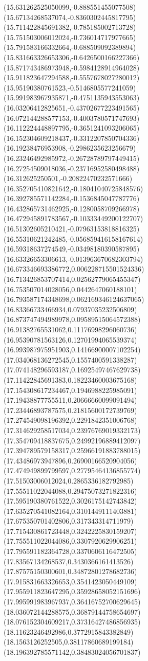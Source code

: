 {(15.631262525050099,-0.888551455077508)
(15.67134268537074,-0.8360302445817795)
(15.711422845691382,-0.785185002713728)
(15.751503006012024,-0.736014717977665)
(15.791583166332664,-0.688509092389894)
(15.831663326653306,-0.6426500166227366)
(15.871743486973948,-0.5984128914964028)
(15.911823647294588,-0.5557678027280012)
(15.95190380761523,-0.5146805577241059)
(15.991983967935871,-0.4751135943553063)
(16.03206412825651,-0.43702677223491565)
(16.072144288577153,-0.4003780571747693)
(16.112224448897795,-0.3651241093206065)
(16.152304609218437,-0.3312207850704336)
(16.19238476953908,-0.2986235623256679)
(16.23246492985972,-0.26728789797449415)
(16.27254509018036,-0.23716952580498488)
(16.312625250501,-0.20822470232571666)
(16.352705410821642,-0.18041040725848576)
(16.392785571142284,-0.1536845047787776)
(16.432865731462925,-0.1280058709266978)
(16.472945891783567,-0.10333449200122707)
(16.51302605210421,-0.07963153818816325)
(16.55310621242485,-0.056859416158167614)
(16.59318637274549,-0.03498180390587895)
(16.63326653306613,-0.013963670682303794)
(16.673346693386772,0.006228715501524336)
(16.713426853707414,0.02562779065455347)
(16.753507014028056,0.0442647060188101)
(16.793587174348698,0.062169346124637065)
(16.83366733466934,0.07937035232506809)
(16.873747494989978,0.09589515064572388)
(16.91382765531062,0.11176998296060736)
(16.95390781563126,0.12701994065539374)
(16.993987975951903,0.14166900007102254)
(17.034068136272545,0.1557400591338287)
(17.074148296593187,0.16925497467629738)
(17.11422845691383,0.18223460003675168)
(17.154308617234467,0.1946988225985091)
(17.19438877755511,0.20666660099091494)
(17.23446893787575,0.21815600172739769)
(17.274549098196392,0.2291842351006768)
(17.314629258517034,0.23976769019332173)
(17.354709418837675,0.24992196889412097)
(17.394789579158317,0.25966191883788015)
(17.43486973947896,0.26900166520904056)
(17.474949899799597,0.27795464136855774)
(17.51503006012024,0.2865336182792985)
(17.55511022044088,0.29475073271822316)
(17.595190380761522,0.3026175142743842)
(17.635270541082164,0.3101449111403881)
(17.675350701402806,0.317343314711979)
(17.715430861723448,0.3242225830159207)
(17.755511022044086,0.3307920629906251)
(17.795591182364728,0.3370606116472505)
(17.83567134268537,0.3430366161413526)
(17.87575150300601,0.34872801278682736)
(17.915831663326653,0.3541423050449109)
(17.955911823647295,0.35928658052151696)
(17.995991983967937,0.36416752700629645)
(18.036072144288575,0.36879144758654697)
(18.076152304609217,0.37316427486856935)
(18.11623246492986,0.3772915843382849)
(18.1563126252505,0.38117860689199184)
(18.196392785571142,0.38483024056701837)
}
